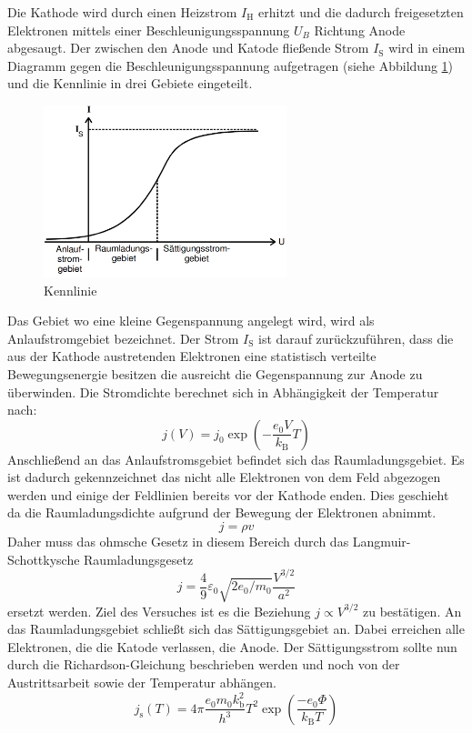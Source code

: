 Die Kathode wird durch einen Heizstrom $I_\text{H}$ erhitzt und die dadurch freigesetzten Elektronen mittels einer Beschleunigungsspannung $U_B$ Richtung Anode abgesaugt. Der zwischen den Anode und Katode fließende Strom $I_\text{S}$ wird in einem Diagramm gegen die Beschleunigungsspannung aufgetragen (siehe Abbildung \ref{fig:Ken}) und die Kennlinie in drei Gebiete eingeteilt.
\begin{figure}
  \centering
  \includegraphics[height=5cm]{picture/Kennlinie.png}
  \caption{Kennlinie \cite{pra}}
  \label{fig:Ken}
\end{figure}
Das Gebiet wo eine kleine Gegenspannung angelegt wird, wird als Anlaufstromgebiet bezeichnet. Der Strom $I_\text{S}$ ist darauf zurückzuführen, dass die aus der Kathode austretenden Elektronen eine statistisch verteilte Bewegungsenergie besitzen die ausreicht die Gegenspannung zur Anode zu überwinden. Die Stromdichte berechnet sich in Abhängigkeit der Temperatur nach:
\begin{equation}
  j(V) = j_0 \exp\left( - \frac{e_0 V}{k_\text{B}}T \right)
  \label{eqn:jv}
\end{equation}
Anschließend an das Anlaufstromsgebiet befindet sich das Raumladungsgebiet. Es ist dadurch gekennzeichnet das nicht alle Elektronen von dem Feld abgezogen werden und einige der Feldlinien bereits vor der Kathode enden. Dies geschieht da die Raumladungsdichte aufgrund der Bewegung der Elektronen abnimmt.
\begin{equation}
  j = \rho v
  \label{eqn:j}
\end{equation}
Daher muss das ohmsche Gesetz in diesem Bereich durch das Langmuir-Schottkysche Raumladungsgesetz
\begin{equation}
  j = \frac{4}{9}\varepsilon_0\sqrt{2e_0/m_0}\frac{V^{3/2}}{a^2}
  \label{eqn:jLS}
\end{equation}
ersetzt werden. Ziel des Versuches ist es die Beziehung $j \propto V^{3/2}$ zu bestätigen.
An das Raumladungsgebiet schließt sich das Sättigungsgebiet an. Dabei erreichen alle  Elektronen, die die Katode verlassen, die Anode. Der Sättigungsstrom sollte nun durch die Richardson-Gleichung beschrieben werden und noch von der Austrittsarbeit sowie der Temperatur abhängen.
\begin{equation}
  j_\text{s} (T) = 4 \pi \frac{e_0 m_0 k_\text{b}^2}{h^3} T^2 \exp \left( \frac{-e_0 \Phi}{k_\text{B} T} \right)
  \label{eqn:js}
\end{equation}


